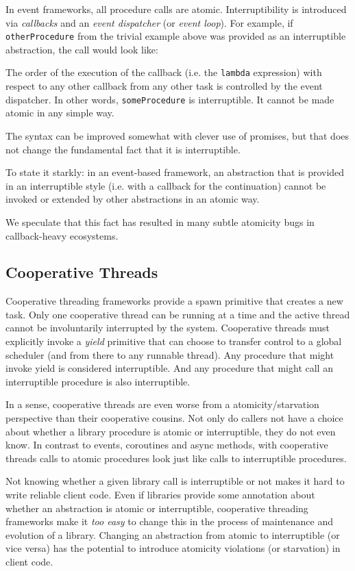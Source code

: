 \documentclass[a4paper,UKenglish,cleveref, autoref]{lipics-v2019}
\begin{document}
In event frameworks, all procedure calls are atomic.
Interruptibility is introduced via \emph{callbacks} and an \emph{event dispatcher} (or \emph{event loop}).
For example, if \texttt{otherProcedure} from the trivial example above was provided as an interruptible abstraction, the call would look like:

\noindent

The order of the execution of the callback (i.e. the \texttt{lambda} expression) with  respect to any other callback from any other task is controlled by the event dispatcher.
In other words, \texttt{someProcedure} is interruptible.
It cannot be made atomic in any simple way.

The syntax can be improved somewhat with clever use of promises, but that does not change the fundamental fact that it is interruptible.

To state it starkly: in an event-based framework, an abstraction that is provided in an interruptible style (i.e. with a callback for the continuation) cannot be invoked or extended by other abstractions in an atomic way.

We speculate that this fact has resulted in many subtle atomicity bugs in callback-heavy ecosystems.

\subsection{Cooperative Threads}


Cooperative threading frameworks provide a spawn primitive that creates a new task.
Only one cooperative thread can be running at a time and the active thread cannot be involuntarily interrupted by the system.
Cooperative threads must explicitly invoke a \emph{yield} primitive that can choose to transfer control to a global scheduler (and from there to any runnable thread).
Any procedure that might invoke yield is considered interruptible.
And any procedure that might call an interruptible procedure is also interruptible.

In a sense, cooperative threads are even worse from a atomicity/starvation perspective than their cooperative cousins.
Not only do callers not have a choice about whether a library procedure is atomic or interruptible, they do not even know.
In contrast to events, coroutines and async methods, with cooperative threads calls to atomic procedures look just like calls to interruptible procedures.

Not knowing whether a given library call is interruptible or not makes it hard to write reliable client code.
Even if libraries provide some annotation about whether an abstraction is atomic or interruptible, cooperative threading frameworks make it \emph{too easy} to change this in the process of maintenance and evolution of a library.
Changing an abstraction from atomic to interruptible (or vice versa) has the potential to introduce atomicity violations (or starvation) in client code.
\end{document}
